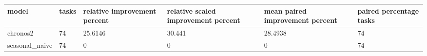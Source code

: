 \begin{tabular}{llllll}
\toprule
model & tasks & relative improvement percent & relative scaled improvement percent & mean paired improvement percent & paired percentage tasks \\
\midrule
chronos2 & 74 & 25.6146 & 30.441 & 28.4938 & 74 \\
seasonal\_naive & 74 & 0 & 0 & 0 & 74 \\
\bottomrule
\end{tabular}
